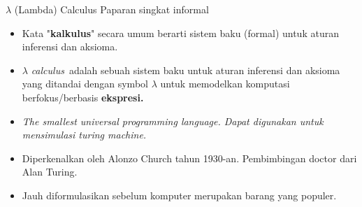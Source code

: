 \documentclass[aspectratio=1610,10pt,handout]{beamer}
\newcommand{\lc}{$\lambda$ {\it calculus}\ }
\begin{document}
\begin{frame}{$\lambda$ (Lambda) Calculus }{Paparan singkat informal}

  \begin{itemize}
    \item<1-> Kata "{\bf kalkulus}" secara umum berarti sistem baku (formal) untuk aturan inferensi dan aksioma.
    \item<2-> \lc adalah sebuah sistem baku untuk aturan inferensi dan aksioma yang ditandai dengan symbol $\lambda$ untuk memodelkan komputasi berfokus/berbasis \bf{ekspresi}.
    \item<3-> \it{The smallest universal programming language}. Dapat digunakan untuk mensimulasi \textit{turing machine}.
    \item<4-> Diperkenalkan oleh Alonzo Church tahun 1930-an. Pembimbingan doctor dari Alan Turing.
   	\item<5-> Jauh diformulasikan sebelum komputer merupakan barang yang populer.
  \end{itemize}
\end{frame}
\end{document}
